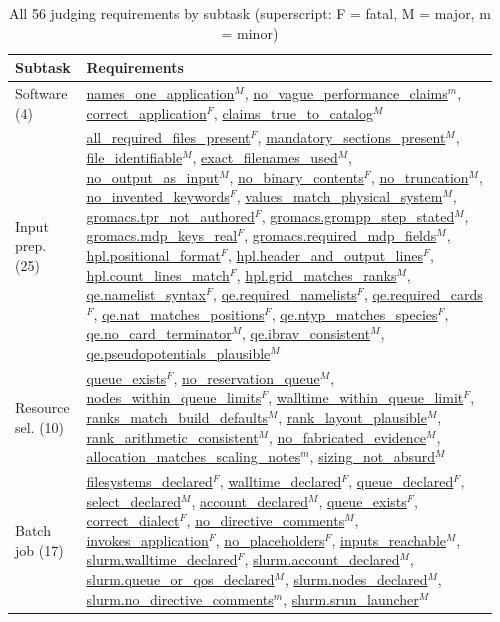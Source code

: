 \documentclass[conference]{IEEEtran}
\begin{document}
\begin{table}[t]
\centering
\scriptsize
\caption{All 56 judging requirements by subtask (superscript: F = fatal, M = major, m = minor)}
\label{tab:rule-list}
\begin{tabular}{@{}p{0.13\linewidth}p{0.83\linewidth}@{}}
\toprule
Subtask & Requirements \\
\midrule
Software (4) & \url{names_one_application}$^{M}$, \url{no_vague_performance_claims}$^{m}$, \url{correct_application}$^{F}$, \url{claims_true_to_catalog}$^{M}$ \\
Input prep. (25) & \url{all_required_files_present}$^{F}$, \url{mandatory_sections_present}$^{M}$, \url{file_identifiable}$^{M}$, \url{exact_filenames_used}$^{M}$, \url{no_output_as_input}$^{M}$, \url{no_binary_contents}$^{F}$, \url{no_truncation}$^{M}$, \url{no_invented_keywords}$^{F}$, \url{values_match_physical_system}$^{M}$, \url{gromacs.tpr_not_authored}$^{F}$, \url{gromacs.grompp_step_stated}$^{M}$, \url{gromacs.mdp_keys_real}$^{F}$, \url{gromacs.required_mdp_fields}$^{M}$, \url{hpl.positional_format}$^{F}$, \url{hpl.header_and_output_lines}$^{F}$, \url{hpl.count_lines_match}$^{F}$, \url{hpl.grid_matches_ranks}$^{M}$, \url{qe.namelist_syntax}$^{F}$, \url{qe.required_namelists}$^{F}$, \url{qe.required_cards}$^{F}$, \url{qe.nat_matches_positions}$^{F}$, \url{qe.ntyp_matches_species}$^{F}$, \url{qe.no_card_terminator}$^{M}$, \url{qe.ibrav_consistent}$^{M}$, \url{qe.pseudopotentials_plausible}$^{M}$ \\
Resource sel. (10) & \url{queue_exists}$^{F}$, \url{no_reservation_queue}$^{M}$, \url{nodes_within_queue_limits}$^{F}$, \url{walltime_within_queue_limit}$^{F}$, \url{ranks_match_build_defaults}$^{M}$, \url{rank_layout_plausible}$^{M}$, \url{rank_arithmetic_consistent}$^{M}$, \url{no_fabricated_evidence}$^{M}$, \url{allocation_matches_scaling_notes}$^{m}$, \url{sizing_not_absurd}$^{M}$ \\
Batch job (17) & \url{filesystems_declared}$^{F}$, \url{walltime_declared}$^{F}$, \url{queue_declared}$^{F}$, \url{select_declared}$^{M}$, \url{account_declared}$^{M}$, \url{queue_exists}$^{F}$, \url{correct_dialect}$^{F}$, \url{no_directive_comments}$^{M}$, \url{invokes_application}$^{F}$, \url{no_placeholders}$^{F}$, \url{inputs_reachable}$^{M}$, \url{slurm.walltime_declared}$^{F}$, \url{slurm.account_declared}$^{M}$, \url{slurm.queue_or_qos_declared}$^{M}$, \url{slurm.nodes_declared}$^{M}$, \url{slurm.no_directive_comments}$^{m}$, \url{slurm.srun_launcher}$^{M}$ \\
\bottomrule
\end{tabular}
\end{table}
\end{document}
